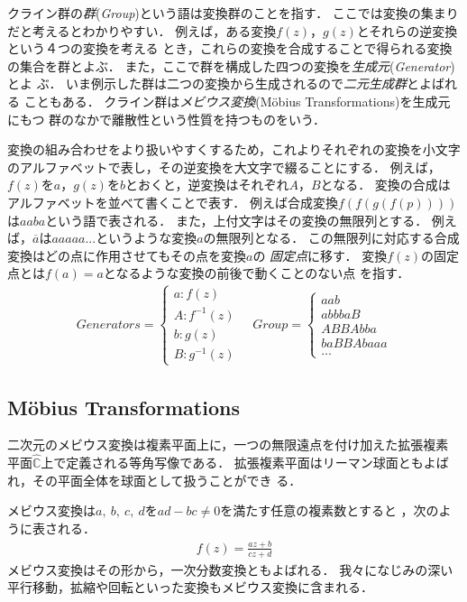 クライン群の\emph{群}(\textit{Group})という語は変換群のことを指す．
ここでは変換の集まりだと考えるとわかりやすい．
例えば，ある変換$f(z)$，$g(z)$とそれらの逆変換という４つの変換を考える
とき，これらの変換を合成することで得られる変換の集合を群とよぶ．
また，ここで群を構成した四つの変換を\emph{生成元}(\textit{Generator})とよ
ぶ．
いま例示した群は二つの変換から生成されるので\emph{二元生成群}とよばれる
こともある．
クライン群は\emph{メビウス変換}(M\"obius Transformations)を生成元にもつ
群のなかで離散性という性質を持つものをいう．

変換の組み合わせをより扱いやすくするため，これよりそれぞれの変換を小文字
のアルファベットで表し，その逆変換を大文字で綴ることにする．
例えば，$f(z)$を$a$，$g(z)$を$b$とおくと，逆変換はそれぞれ$A$，$B$となる．
変換の合成はアルファベットを並べて書くことで表す．
例えば合成変換$f(f(g(f(p))))$は$aaba$という語で表される．
また，上付文字はその変換の無限列とする．
例えば，$\overline{a}$は$aaaaa...$というような変換$a$の無限列となる．
この無限列に対応する合成変換はどの点に作用させてもその点を変換$a$の
\emph{固定点}に移す．
変換$f(z)$の固定点とは$f(a) = a$となるような変換の前後で動くことのない点
を指す．
 \begin{align*}
  Generators =
   \begin{cases}
    a \colon f(z) \\
    A \colon f^{-1}(z) \\
    b \colon g(z) \\
    B \colon g^{-1}(z)
   \end{cases}
  \quad
  Group =
   \begin{cases}
    aab\\
    abbbaB \\
    ABBAbba \\
    baBBAbaaa \\
    ...
   \end{cases}
 \end{align*}

\subsection{M\"obius Transformations}

二次元のメビウス変換は複素平面上に，一つの無限遠点を付け加えた拡張複素
平面$\hat{\mathbb{C}}$上で定義される等角写像である．
拡張複素平面はリーマン球面ともよばれ，その平面全体を球面として扱うことができ
る．

メビウス変換は$a,~b,~c,~d$を$ad - bc \neq 0$を満たす任意の複素数とすると
，次のように表される．
\begin{align*}
 f(z) = \frac{az + b}{cz + d}
\end{align*}
メビウス変換はその形から，一次分数変換ともよばれる．
我々になじみの深い平行移動，拡縮や回転といった変換もメビウス変換に含まれる．

